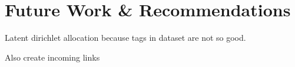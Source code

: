 \section{Future Work \& Recommendations}
Latent dirichlet allocation because tags in dataset are not so good.

Also create incoming links

